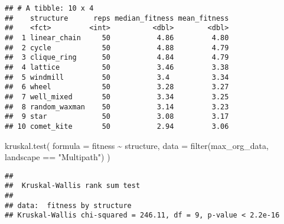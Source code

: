 \documentclass[
]{book}
\newenvironment{Shaded}{\begin{snugshade}}{\end{snugshade}}
\newcommand{\AttributeTok}[1]{\textcolor[rgb]{0.77,0.63,0.00}{#1}}
\newcommand{\ConstantTok}[1]{\textcolor[rgb]{0.00,0.00,0.00}{#1}}
\newcommand{\FunctionTok}[1]{\textcolor[rgb]{0.00,0.00,0.00}{#1}}
\newcommand{\NormalTok}[1]{#1}
\newcommand{\OtherTok}[1]{\textcolor[rgb]{0.56,0.35,0.01}{#1}}
\newcommand{\SpecialCharTok}[1]{\textcolor[rgb]{0.00,0.00,0.00}{#1}}
\newcommand{\StringTok}[1]{\textcolor[rgb]{0.31,0.60,0.02}{#1}}
\begin{document}
\begin{verbatim}
## # A tibble: 10 x 4
##    structure      reps median_fitness mean_fitness
##    <fct>         <int>          <dbl>        <dbl>
##  1 linear_chain     50           4.86         4.80
##  2 cycle            50           4.88         4.79
##  3 clique_ring      50           4.84         4.79
##  4 lattice          50           3.46         3.38
##  5 windmill         50           3.4          3.34
##  6 wheel            50           3.28         3.27
##  7 well_mixed       50           3.34         3.25
##  8 random_waxman    50           3.14         3.23
##  9 star             50           3.08         3.17
## 10 comet_kite       50           2.94         3.06
\end{verbatim}

\begin{Shaded}
\begin{Highlighting}[]
\FunctionTok{kruskal.test}\NormalTok{(}
  \AttributeTok{formula =}\NormalTok{ fitness }\SpecialCharTok{\textasciitilde{}}\NormalTok{ structure,}
  \AttributeTok{data =} \FunctionTok{filter}\NormalTok{(max\_org\_data, landscape }\SpecialCharTok{==} \StringTok{"Multipath"}\NormalTok{)}
\NormalTok{)}
\end{Highlighting}
\end{Shaded}

\begin{verbatim}
## 
##  Kruskal-Wallis rank sum test
## 
## data:  fitness by structure
## Kruskal-Wallis chi-squared = 246.11, df = 9, p-value < 2.2e-16
\end{verbatim}

\begin{Shaded}
\end{Shaded}
\end{document}
